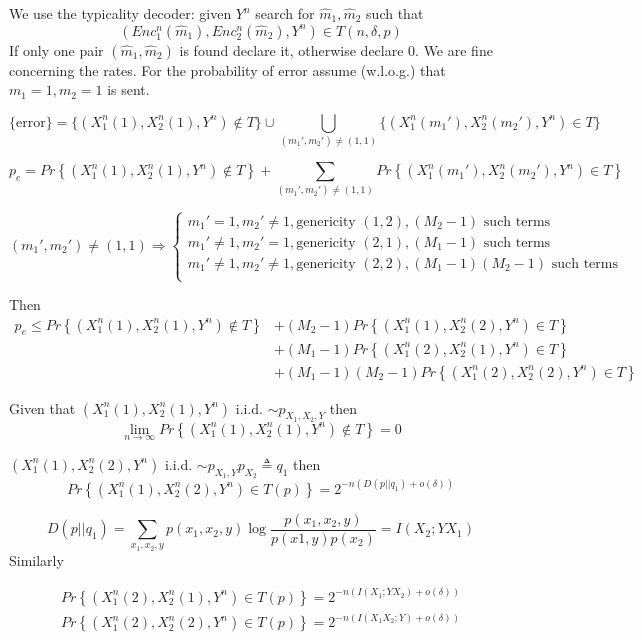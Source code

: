 \documentclass[twoside]{article}
\theoremstyle{definition} %
\renewcommand{\Pr}[1]{Pr\left\{#1\right\}}
\begin{document}
We use the typicality decoder: given $Y^n$ search for $\hat m_1, \hat m_2$ such that
\[
  (Enc_1^n(\hat m_1), Enc_2^n(\hat m_2), Y^n) \in T(n, \delta, p)
\]
If only one pair $(\hat m_1, \hat m_2)$ is found declare it, otherwise declare 0. We are fine concerning the rates. For the probability of error assume (w.l.o.g.) that $m_1 = 1, m_2 = 1$ is sent.

\[
  \{
    \text{error}
  \}
  =
  \{(X_1^n(1), X_2^n(1), Y^n) \not \in T\} \cup \bigcup_{(m_1',m_2') \not=(1,1)} \{(X_1^n(m_1'), X_2^n(m_2'), Y^n) \in T\}
\]

\[
  p_e = \Pr{(X_1^n(1), X_2^n(1), Y^n) \not \in T} + \sum_{(m_1',m_2') \not=(1,1)} \Pr{(X_1^n(m_1'), X_2^n(m_2'), Y^n) \in T}
\]

\[
  (m_1', m_2') \not = (1,1) \Rightarrow \begin{cases}
    m_1' = 1, m_2' \not=1, \text{genericity } (1,2), (M_2 - 1) \text{ such terms}\\
    m_1' \not= 1, m_2' =1, \text{genericity } (2,1), (M_1 - 1) \text{ such terms}\\
    m_1' \not= 1, m_2' \not=1, \text{genericity } (2,2), (M_1 - 1)(M_2 - 1) \text{ such terms}\\
  \end{cases}
\]

Then
\begin{align*}
  p_e \leq \Pr{(X_1^n(1), X_2^n(1), Y^n) \not \in T}
  & + (M_2 - 1) \Pr{(X_1^n(1), X_2^n(2), Y^n) \in T}\\
  & + (M_1 - 1) \Pr{(X_1^n(2), X_2^n(1), Y^n) \in T}\\
  & + (M_1 - 1)(M_2 - 1) \Pr{(X_1^n(2), X_2^n(2), Y^n) \in T}
\end{align*}

Given that $(X_1^n(1), X_2^n(1), Y^n)$ i.i.d. $\sim p_{X_1,X_2,Y}$ then
\[
  \lim_{n \to \infty} \Pr{(X_1^n(1), X_2^n(1), Y^n) \not \in T} = 0
\]

$(X_1^n(1), X_2^n(2), Y^n)$ i.i.d. $\sim p_{X_1,Y}p_{X_2} \triangleq q_1$ then
\[
  \Pr{(X_1^n(1), X_2^n(2), Y^n) \in T(p)} = 2^{-n(D(p||q_1) + o(\delta))}
\]

\[
  D(p||q_1) = \sum_{x_1,x_2,y} p(x_1,x_2,y) \log \frac {p(x_1,x_2,y)}{p(x1,y)p(x_2)} = I(X_2; YX_1)
\]
Similarly

\begin{align*}
    \Pr{(X_1^n(2), X_2^n(1), Y^n) \in T(p)} = 2^{-n(I(X_1;YX_2) + o(\delta))}\\
    \Pr{(X_1^n(2), X_2^n(2), Y^n) \in T(p)} = 2^{-n(I(X_1X_2;Y) + o(\delta))}
\end{align*}
\end{document}
